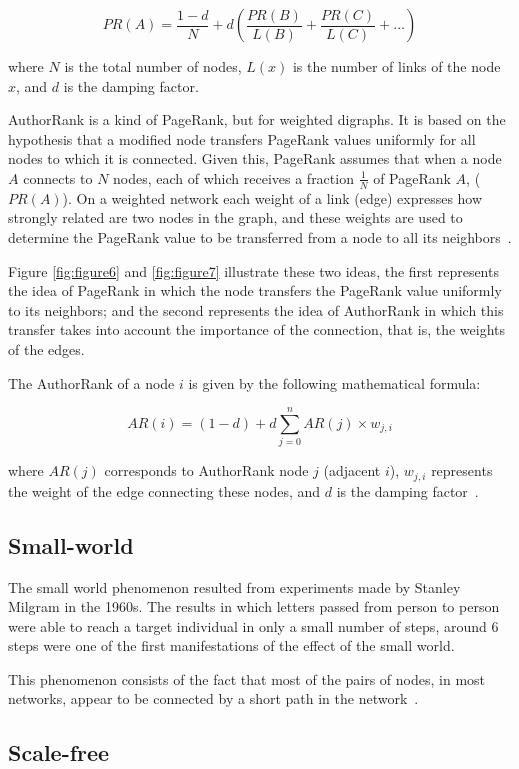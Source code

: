 \documentclass{article}
\begin{document}
\begin{multicols}{2}
$$
PR(A)=\frac{1-d}{N}+d \left(\frac{PR(B)}{L(B)}+\frac{PR(C)}{L(C)}+...\right)
$$

where $N$ is the total number of nodes, $L(x)$ is the number of links of the node $x$, and $d$ is the damping factor.

AuthorRank is a kind of PageRank, but for weighted digraphs. It is based on the hypothesis that a modified node transfers PageRank values uniformly for all nodes to which it is connected. Given this, PageRank assumes that when a node $A$ connects to $N$ nodes, each of which receives a fraction $\frac{1}{N}$ of PageRank $A$, ($PR(A)$). On a weighted network each weight of a link (edge) expresses how strongly related are two nodes in the graph, and these weights are used to determine the PageRank value to be transferred from a node to all its neighbors~\cite{liu2005co, towardsaut2011}.

Figure \ref{fig:figure6} and \ref{fig:figure7} illustrate these two ideas, the first represents the idea of PageRank in which the node transfers the PageRank value uniformly to its neighbors; and the second represents the idea of AuthorRank in which this transfer takes into account the importance of the connection, that is, the weights of the edges.

The AuthorRank of a node $i$ is given by the following mathematical formula:

$$
AR(i)=(1-d)+d\sum\limits_{j=0}^{n}AR(j)\times w_{j,i}
$$

where $AR(j)$ corresponds to AuthorRank node $j$ (adjacent $i$), $w_{j,i}$ represents the weight of the edge connecting these nodes, and $d$ is the damping factor~\cite{liu2005co}.


\subsection{Small-world}

The small world phenomenon resulted from experiments made by Stanley Milgram in the 1960s. The results in which letters passed from person to person were able to reach a target individual in only a small number of steps, around 6 steps were one of the first manifestations of the effect of the small world.

This phenomenon consists of the fact that most of the pairs of nodes, in most networks, appear to be connected by a short path in the network~\cite{newman2003structure}.


\subsection{Scale-free}


\end{multicols}
\end{document}
